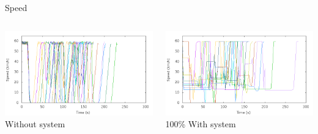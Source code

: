\begin{frame}{Speed}
\begin{columns}
	\begin{column}{0.5\textwidth}
	\includegraphics[width=1\textwidth]{images/tp0/speed0.png}\\
	Without system
	\end{column}
	\begin{column}{0.5\textwidth}
	\includegraphics[width=1\textwidth]{images/tp0/speed100.png}\\
	100\% With system
	\end{column}
\end{columns}
\end{frame}
